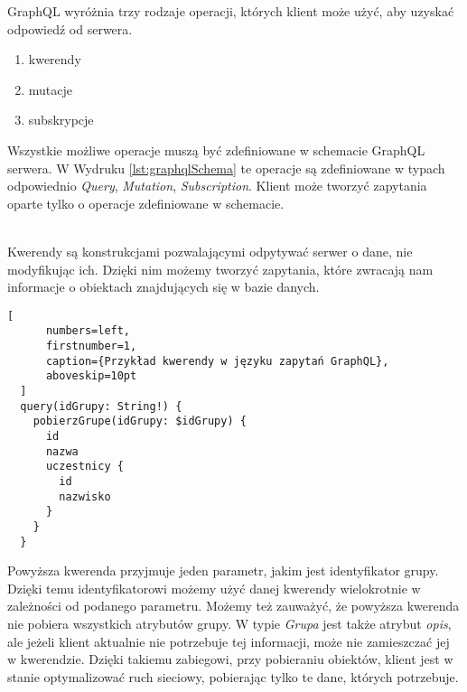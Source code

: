 GraphQL wyróżnia trzy rodzaje operacji, których klient może użyć, aby uzyskać odpowiedź od serwera.
\begin{enumerate}
  \item kwerendy
  \item mutacje
  \item subskrypcje
\end{enumerate}
Wszystkie możliwe operacje muszą być zdefiniowane w schemacie GraphQL serwera. W Wydruku \ref{lst:graphqlSchema} te operacje są zdefiniowane w typach odpowiednio \emph{Query}, \emph{Mutation}, \emph{Subscription}. Klient może tworzyć zapytania oparte tylko o operacje zdefiniowane w schemacie.

\begin{description}[leftmargin={15pt},labelindent={0pt}]
  \item[Kwerendy] \hfill \\ Kwerendy są konstrukcjami pozwalającymi odpytywać serwer o dane, nie modyfikując ich. Dzięki nim możemy tworzyć zapytania, które zwracają nam informacje o obiektach znajdujących się w bazie danych.
  \begin{addmargin}[6mm]{0mm}
  \begin{lstlisting}[
      numbers=left,
      firstnumber=1,
      caption={Przykład kwerendy w języku zapytań GraphQL},
      aboveskip=10pt
  ]
  query(idGrupy: String!) {
    pobierzGrupe(idGrupy: $idGrupy) {
      id
      nazwa
      uczestnicy {
        id
        nazwisko
      }
    }
  }
  \end{lstlisting}
  \end{addmargin}

  Powyższa kwerenda przyjmuje jeden parametr, jakim jest identyfikator grupy. Dzięki temu identyfikatorowi możemy użyć danej kwerendy wielokrotnie w zależności od podanego parametru. Możemy też zauważyć, że powyższa kwerenda nie pobiera wszystkich atrybutów grupy. W typie \emph{Grupa} jest także atrybut \emph{opis}, ale jeżeli klient aktualnie nie potrzebuje tej informacji, może nie zamieszczać jej w kwerendzie. Dzięki takiemu zabiegowi, przy pobieraniu obiektów, klient jest w stanie optymalizować ruch sieciowy, pobierając tylko te dane, których potrzebuje.


\end{description}
